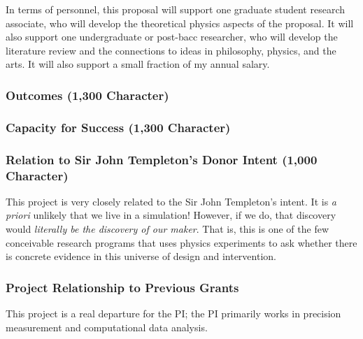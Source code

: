 \documentclass[12pt]{article}
\begin{document}
In terms of personnel, this proposal will support one graduate student research associate, who will develop the theoretical physics aspects of the proposal.
It will also support one undergraduate or post-bacc researcher, who will develop the literature review and the connections to ideas in philosophy, physics, and the arts.
It will also support a small fraction of my annual salary.

\subsubsection*{Outcomes (1,300 Character)}

\subsubsection*{Capacity for Success (1,300 Character)}


\subsubsection*{Relation to Sir John Templeton's Donor Intent (1,000 Character)}
This project is very closely related to the Sir John Templeton's intent.
It is \textsl{a priori} unlikely that we live in a simulation!
However, if we do, that discovery would \emph{literally be the discovery of our maker}.
That is, this is one of the few conceivable research programs that uses physics experiments to ask whether there is concrete evidence in this universe of design and intervention.

\subsubsection*{Project Relationship to Previous Grants}
This project is a real departure for the PI;
the PI primarily works in precision measurement and computational data analysis.
\end{document}
